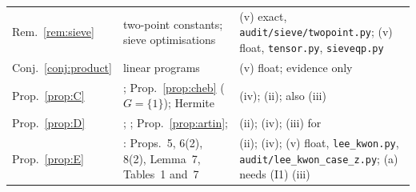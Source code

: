 \documentclass[11pt]{amsart}
\theoremstyle{definition}
\theoremstyle{remark}
\begin{document}
{\begin{longtable}{@{}>{\raggedright\arraybackslash}p{}>{\raggedright\arraybackslash}p{}>{\raggedright\arraybackslash}p{}@{}}
Rem.~\ref{rem:sieve} & two-point constants; sieve optimisations
  & (v) exact, \texttt{audit/\allowbreak{}sieve/\allowbreak{}twopoint.py}; (v) float, \texttt{tensor.py}, \texttt{sieveqp.py} \\
Conj.~\ref{conj:product} & linear programs & (v) float; evidence only \\
Prop.~\ref{prop:C} & \cite[Lemma~3]{EV}; Prop.~\ref{prop:cheb} ($G=\{1\}$); Hermite
  & (iv); (ii); also \cite[Cor.~1.4]{FSW} (iii) \\
Prop.~\ref{prop:D} & \cite[Prop.~7, Cor.~8]{Coj05}; \cite[Thm.~1.3, Thm.~3.8]{DW}; Prop.~\ref{prop:artin};
  \cite[footnote~1]{Zyw08} & (ii); (iv); (iii) for \cite{Zyw08} \\
Prop.~\ref{prop:E} & \cite{LK}: Props.~5, 6(2), 8(2), Lemma~7, Tables~1 and~7
  & (ii); (iv); (v) float, \texttt{lee\_\allowbreak{}kwon.py}, \texttt{audit/\allowbreak{}lee\_\allowbreak{}kwon\_\allowbreak{}case\_\allowbreak{}z.py}; (a) needs (I1) (iii) \\
\end{longtable}}
\end{document}
